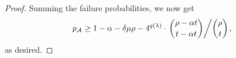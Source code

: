 \begin{proof}
  Summing the failure probabilities, we now get
  \[
    p_{\advA} \ge 1 - \alpha - \delta \mu \rho
    - 4^{q(\lambda)} \cdot \left. \binom{\rho - \alpha t}{t - \alpha t} \middle/ \binom{\rho}{t} \right.,
  \]
  as desired.
\end{proof}


